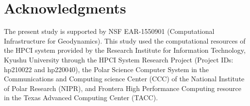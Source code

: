 \section*{Acknowledgments}
The present study is supported by NSF EAR-1550901 (Computational Infrastructure for Geodynamics).
This study used the computational resources of the HPCI system provided by the Research Institute for Information Technology, Kyushu University through the HPCI System Research Project (Project IDs: hp210022 and hp220040), the Polar Science Computer System in the Communications and Computing science Center (CCC) of the National Institute of Polar Research (NIPR), and Frontera High Performance Computing resource in the Texas Advanced Computing Center (TACC). 
